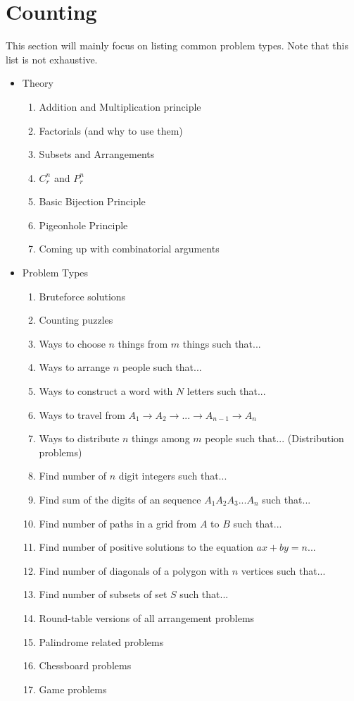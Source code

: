 \documentclass[oneside]{book}
\begin{document}
\newpage

\section{Counting}
This section will mainly focus on listing common problem types. Note that this list is not exhaustive.
\begin{itemize}
    \item Theory
        \begin{enumerate}
            \item Addition and Multiplication principle
            \item Factorials (and why to use them)
            \item Subsets and Arrangements
            \item $C^{n}_r$ and $P^{n}_r$
            \item Basic Bijection Principle
            \item Pigeonhole Principle
            \item Coming up with combinatorial arguments
        \end{enumerate}
    \item Problem Types
        \begin{enumerate}
            \item Bruteforce solutions
            \item Counting puzzles
            \item Ways to choose $n$ things from $m$ things such that...
            \item Ways to arrange $n$ people such that...
            \item Ways to construct a word with $N$ letters such that...
            \item Ways to travel from $A_1 \rightarrow A_2\rightarrow ... \rightarrow A_{n-1} \rightarrow A_n$
            \item Ways to distribute $n$ things among $m$ people such that... (Distribution problems)
            \item Find number of $n$ digit integers such that...
            \item Find sum of the digits of an sequence $A_1A_2A_3...A_n$ such that...
            \item Find number of paths in a grid from $A$ to $B$ such that...
            \item Find number of positive solutions to the equation $ax + by = n$...
            \item Find number of diagonals of a polygon with $n$ vertices such that...
            \item Find number of subsets of set $S$ such that...
            \item Round-table versions of all arrangement problems
            \item Palindrome related problems
            \item Chessboard problems
            \item Game problems
        \end{enumerate}
\end{itemize}
\newpage
\end{document}
